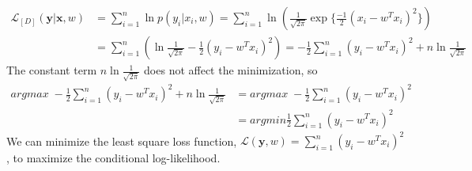 \begin{align*}
    \mathcal{L}_{[D]}(\mathbf{y}|\mathbf{x},w)&=\sum_{i=1}^n\ln p(y_i|x_i,w) = \sum_{i=1}^n\ln (\frac{1}{\sqrt{2\pi}}\exp\{\frac{-1}{2}(x_i-w^Tx_i)^2\}) \\
    &=\sum_{i=1}^n(\ln\frac{1}{\sqrt{2\pi}}-\frac{1}{2}(y_i-w^Tx_i)^2) = -\frac{1}{2}\sum_{i=1}^n(y_i-w^Tx_i)^2+n\ln\frac{1}{\sqrt{2\pi}}
\end{align*}
The constant term $n\ln\frac{1}{\sqrt{2\pi}}$ does not affect the minimization, so
\begin{align*}
    argmax\;-\frac{1}{2}\sum_{i=1}^n(y_i-w^Tx_i)^2+n\ln\frac{1}{\sqrt{2\pi}} &= argmax\;-\frac{1}{2}\sum_{i=1}^n(y_i-w^Tx_i)^2 \\
    &= argmin \frac{1}{2}\sum_{i=1}^n(y_i-w^Tx_i)^2
\end{align*}
We can minimize the least square loss function, $\mathcal{L}(\mathbf{y},w)=\sum_{i=1}^n(y_i-w^Tx_i)^2$, to maximize the conditional log-likelihood.
